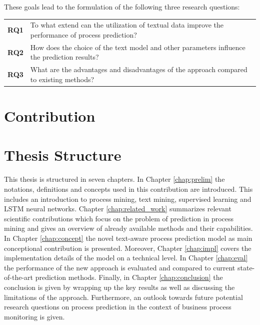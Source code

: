 These goals lead to the formulation of the following three research questions:

\begin{tabularx}{\textwidth}{lX}
	\textbf{RQ1} & To what extend can the utilization of textual data improve the performance of process prediction? \\
	\textbf{RQ2} & How does the choice of the text model and other parameters influence the prediction results?\\
	\textbf{RQ3} & What are the advantages and disadvantages of the approach compared to existing methods?
\end{tabularx}

\section{Contribution}



\section{Thesis Structure}

This thesis is structured in seven chapters.
In Chapter \ref{chap:prelim} the notations, definitions and concepts used in this contribution are introduced.
This includes an introduction to process mining, text mining, supervised learning and LSTM neural networks.
Chapter \ref{chap:related_work} summarizes relevant scientific contributions which focus on the problem of prediction in process mining and gives an overview of already available methods and their capabilities.
In Chapter \ref{chap:concept} the novel text-aware process prediction model as main conceptional contribution is presented.
Moreover, Chapter \ref{chap:impl} covers the implementation details of the model on a technical level.
In Chapter \ref{chap:eval} the performance of the new approach is evaluated and compared to current state-of-the-art prediction methods.
Finally, in Chapter \ref{chap:conclusion} the conclusion is given by wrapping up the key results as well as discussing the limitations of the approach.
Furthermore, an outlook towards future potential research questions on process prediction in the context of business process monitoring is given.